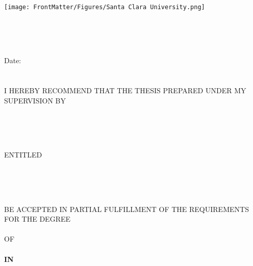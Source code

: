 

\addtolength{\topmargin}{0.5in}
\thispagestyle{empty}


\begin{center}
\begin{spacing}{1.0}
  \texttt{[image: FrontMatter/Figures/Santa Clara University.png]}   
  
  \begin{large}
    \textbf{\titlecap{\tuniversity}} \\
    \textbf{\titlecap{\tdepartment}} \\~\\
   \end{large}

   \hfill Date: \tdateSubmitted \\~\\~\\

I HEREBY RECOMMEND THAT THE THESIS PREPARED UNDER MY SUPERVISION BY \\~\\

\begin{large}
\textbf{\tstudents} \\~\\
\end{large}

ENTITLED\\~\\

\begin{large}
\textbf{\ttitle} \\~\\
\end{large}

BE ACCEPTED IN PARTIAL FULFILLMENT OF THE REQUIREMENTS FOR THE DEGREE \\~\\

OF \\~\\

\textbf{\MakeUppercase{\tdegree}} \textbf{IN} \textbf{\MakeUppercase{\tdepartment}} \\~\\
\end{spacing}
\end{center}

\newcommand{\thesisadvisors}[1]{
    \begin{FlushRight} 
    \begin{singlespace}   
    I certify that I have read this dissertation and that, in my opinion, it is fully adequate in scope and quality as a dissertation for the degree of \titlecap{\tdegree}. \\[1in]
    \textbf{#1} \\
    Date: \tdateSubmitted\     
    \end{singlespace}
    \end{FlushRight}    
}


